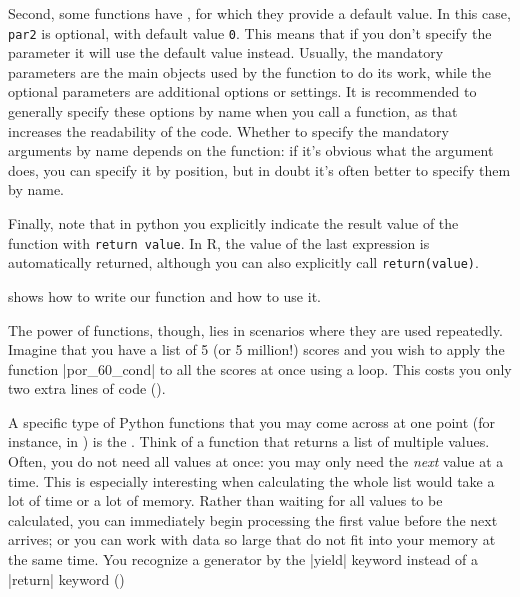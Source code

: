 Second, some functions have , for which they provide a default value.
In this case, \verb|par2| is optional, with default value \verb|0|.
This means that if you don't specify the parameter it will use the default value instead.
Usually, the mandatory parameters are the main objects used by the function to do its work,
while the optional parameters are additional options or settings.
It is recommended to generally specify these options by name when you call a function,
as that increases the readability of the code.
Whether to specify the mandatory arguments by name depends on the function:
if it's obvious what the argument does, you can specify it by position,
but in doubt it's often better to specify them by name. 

Finally, note that in python you explicitly indicate the result value of the function with
\verb|return value|.
In R, the value of the last expression is automatically returned,
although you can also explicitly call \verb|return(value)|. 

 shows how to write our function and how to use it.

The power of functions, though, lies in scenarios where they are used
repeatedly.  Imagine that you have a list of 5 (or 5 million!) scores
and you wish to apply the function |por_60_cond| to all the scores at
once using a loop. This costs you only two extra lines of code
().



\begin{feature}
  A specific type of Python functions that you may come across at one point (for instance, in ) is the . Think of a function that returns a list of multiple values. Often, you do not need all values at once: you may only need the \emph{next} value at a time. This is especially interesting when calculating the whole list would take a lot of time or a lot of memory. Rather than waiting for all values to be calculated, you can immediately begin processing the first value before the next arrives; or you can work with data so large that do not fit into your memory at the same time.  You recognize a generator by the |yield| keyword instead of a |return| keyword ()
\end{feature}






